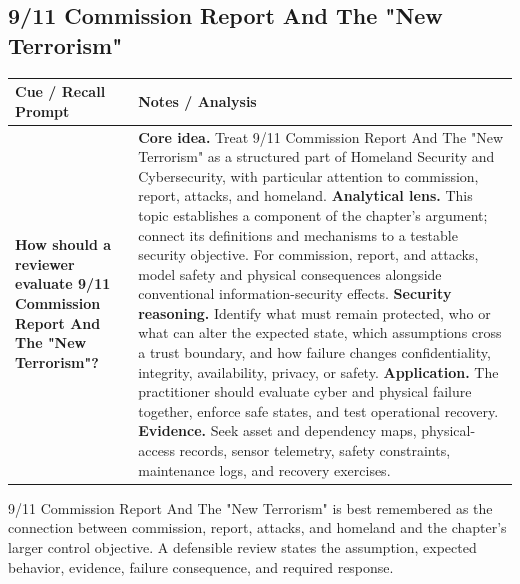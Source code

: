 \documentclass[11pt]{article}
\newcommand{\CornellHeader}{%
\rowcolor{Navy}\color{white}\bfseries Cue / Recall Prompt & \color{white}\bfseries Notes / Analysis\\\hline}
\newcommand{\CornellRow}[2]{%
\cellcolor{CueGray}\RaggedRight\textbf{#1} & \RaggedRight #2\\\hline}
\begin{document}
\subsection*{9/11 Commission Report And The "New Terrorism"}
\begin{longtable}{>{\RaggedRight\arraybackslash}p{}|>{\RaggedRight\arraybackslash}p{}}
\CornellHeader
\CornellRow{How should a reviewer evaluate 9/11 Commission Report And The "New Terrorism"?}{\textbf{Core idea.} Treat 9/11 Commission Report And The "New Terrorism" as a structured part of Homeland Security and Cybersecurity, with particular attention to commission, report, attacks, and homeland. \textbf{Analytical lens.} This topic establishes a component of the chapter's argument; connect its definitions and mechanisms to a testable security objective. For commission, report, and attacks, model safety and physical consequences alongside conventional information-security effects. \textbf{Security reasoning.} Identify what must remain protected, who or what can alter the expected state, which assumptions cross a trust boundary, and how failure changes confidentiality, integrity, availability, privacy, or safety. \textbf{Application.} The practitioner should evaluate cyber and physical failure together, enforce safe states, and test operational recovery. \textbf{Evidence.} Seek asset and dependency maps, physical-access records, sensor telemetry, safety constraints, maintenance logs, and recovery exercises.}
\end{longtable}
\begin{topicsummary}
9/11 Commission Report And The "New Terrorism" is best remembered as the connection between commission, report, attacks, and homeland and the chapter's larger control objective. A defensible review states the assumption, expected behavior, evidence, failure consequence, and required response.
\end{topicsummary}
\end{document}
